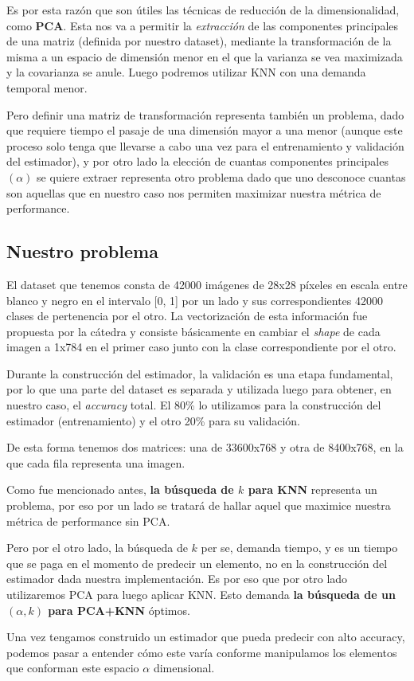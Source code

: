 Es por esta razón que son útiles las técnicas de reducción de la dimensionalidad, como \textbf{PCA}. Esta nos va a permitir la \textit{extracción} de las componentes principales de una matriz (definida por nuestro dataset), mediante la transformación de la misma a un espacio de dimensión menor en el que la varianza se vea maximizada y la covarianza se anule. Luego podremos utilizar KNN con una demanda temporal menor.

Pero definir una matriz de transformación representa también un problema, dado que requiere tiempo el pasaje de una dimensión mayor a una menor (aunque este proceso solo tenga que llevarse a cabo una vez para el entrenamiento y validación del estimador), y por otro lado la elección de cuantas componentes principales $(\alpha)$ se quiere extraer representa otro problema dado que uno desconoce cuantas son aquellas que en nuestro caso nos permiten maximizar nuestra métrica de performance.

\subsection{Nuestro problema}

El dataset que tenemos consta de 42000 imágenes de 28x28 píxeles en escala entre blanco y negro en el intervalo [0, 1] por un lado y sus correspondientes 42000 clases de pertenencia por el otro. La vectorización de esta información fue propuesta por la cátedra y consiste básicamente en cambiar el \textit{shape} de cada imagen a 1x784 en el primer caso junto con la clase correspondiente por el otro.

Durante la construcción del estimador, la validación es una etapa fundamental, por lo que una parte del dataset es separada y utilizada luego para obtener, en nuestro caso, el \textit{accuracy} total. El 80\% lo utilizamos para la construcción del estimador (entrenamiento) y el otro 20\% para su validación.

De esta forma tenemos dos matrices: una de 33600x768 y otra de 8400x768, en la que cada fila representa una imagen.

Como fue mencionado antes, \textbf{la búsqueda de $k$ para KNN} representa un problema, por eso por un lado se tratará de hallar aquel que maximice nuestra métrica de performance sin PCA.

Pero por el otro lado, la búsqueda de $k$ per se, demanda tiempo, y es un tiempo que se paga en el momento de predecir un elemento, no en la construcción del estimador dada nuestra implementación. Es por eso que por otro lado utilizaremos PCA para luego aplicar KNN. Esto demanda \textbf{la búsqueda de un $(\alpha, k)$ para PCA+KNN} óptimos.

Una vez tengamos construido un estimador que pueda predecir con alto accuracy, podemos pasar a entender cómo este varía conforme manipulamos los elementos que conforman este espacio $\alpha$ dimensional.